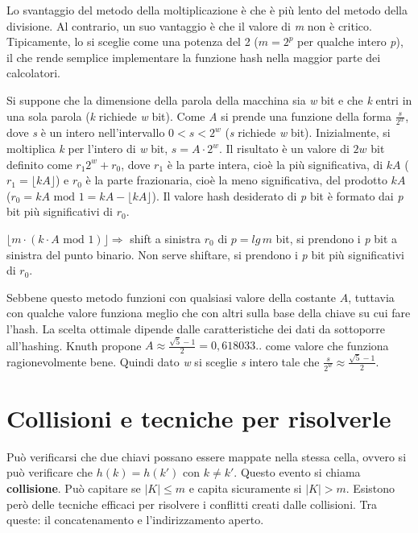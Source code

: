 \documentclass[10pt, a4paper]{report}
\begin{document}
Lo svantaggio del metodo della moltiplicazione è che è più lento del metodo della divisione. Al contrario, un suo vantaggio è che il valore di \textit{m} non è critico. Tipicamente, lo si sceglie come una potenza del 2 ($m = 2^p$ per qualche intero \textit{p}), il che rende semplice implementare la funzione hash nella maggior parte dei calcolatori.

Si suppone che la dimensione della parola della macchina sia \textit{w} bit e che \textit{k} entri in una sola parola (\textit{k} richiede \textit{w} bit). Come \textit{A} si prende una funzione della forma $\frac{s}{2^w}$, dove \textit{s} è un intero nell'intervallo $0 < s < 2^w$ (\textit{s} richiede \textit{w} bit). Inizialmente, si moltiplica \textit{k} per l'intero di \textit{w} bit, $s = A \cdot 2^w$. Il risultato è un valore di $2w$ bit definito come $r_1 2^w + r_0$, dove $r_1$ è la parte intera, cioè la più significativa, di $kA$ ($r_1 = \lfloor kA \rfloor$) e $r_0$ è la parte frazionaria, cioè la meno significativa, del prodotto $kA$ ($r_0 = kA \text{ mod } 1 = kA -  \lfloor kA \rfloor$). Il valore hash desiderato di \textit{p} bit è formato dai \textit{p} bit più significativi di $r_0$.

$\lfloor m \cdot (k \cdot A \text{ mod } 1) \rfloor \Rightarrow$ shift a sinistra $r_0$ di $p = lg\,m$ bit, si prendono i \textit{p} bit a sinistra del punto binario. Non serve shiftare, si prendono i \textit{p} bit più significativi di $r_0$.

Sebbene questo metodo funzioni con qualsiasi valore della costante $A$, tuttavia con qualche valore funziona meglio che con altri sulla base della chiave su cui fare l'hash. La scelta ottimale dipende dalle caratteristiche dei dati da sottoporre all'hashing. Knuth propone $A \approx \frac{\sqrt{5} - 1}{2} = 0,618033..$ come valore che funziona ragionevolmente bene. Quindi dato \textit{w} si sceglie \textit{s} intero tale che $\frac{s}{2^w} \approx \frac{\sqrt{5} - 1}{2}$.
\section{Collisioni e tecniche per risolverle}
Può verificarsi che due chiavi possano essere mappate nella stessa cella, ovvero si può verificare che $h(k) = h(k')$ con $k \not= k'$. Questo evento si chiama \textbf{collisione}. Può capitare se $|K| \leq m$ e capita sicuramente si $|K| > m$. Esistono però delle tecniche efficaci per risolvere i conflitti creati dalle collisioni. Tra queste: il concatenamento e l'indirizzamento aperto. 
\end{document}
